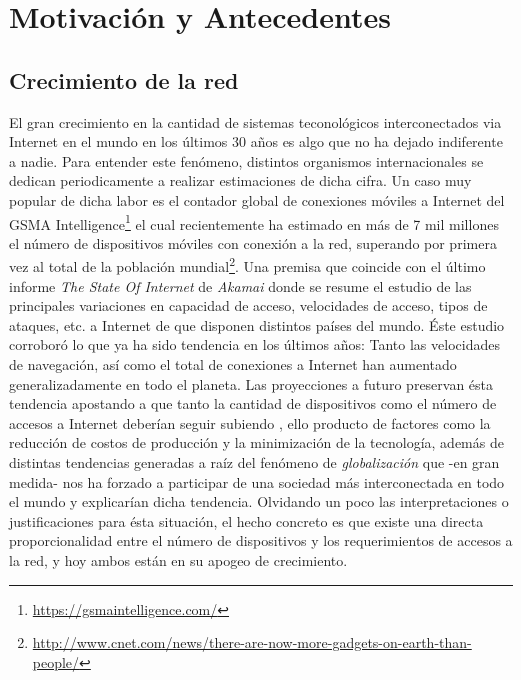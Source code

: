 \chapter{Motivación y Antecedentes}
\section{Crecimiento de la red}
El gran crecimiento en la cantidad de sistemas teconológicos interconectados via Internet en el mundo en los últimos 30 años es algo que no ha dejado indiferente a nadie. Para entender este fenómeno, distintos organismos internacionales se dedican periodicamente a realizar estimaciones de dicha cifra. Un caso muy popular de dicha labor es el contador global de conexiones móviles a Internet del GSMA Intelligence\footnote{\url{https://gsmaintelligence.com/}} el cual recientemente ha estimado en más de 7 mil millones el número de dispositivos móviles con conexión a la red, superando por primera vez al total de la población mundial\footnote{\url{http://www.cnet.com/news/there-are-now-more-gadgets-on-earth-than-people/}}. Una premisa que coincide con el último informe \emph{The State Of Internet} de \emph{Akamai} \cite{report:akamai} donde se resume el estudio de las principales variaciones en capacidad de acceso, velocidades de acceso, tipos de ataques, etc. a Internet de que disponen distintos países del mundo. Éste estudio corroboró lo que ya ha sido tendencia en los últimos años: Tanto las velocidades de navegación, así como el total de conexiones a Internet han aumentado generalizadamente en todo el planeta. Las proyecciones a futuro preservan ésta tendencia apostando a que tanto la cantidad de dispositivos como el número de accesos a Internet deberían seguir subiendo \cite{nota:2020}, ello producto de factores como la reducción de costos de producción y la minimización de la tecnología, además de distintas tendencias generadas a raíz del fenómeno de \emph{globalización} que -en gran medida- nos ha forzado a participar de una sociedad más interconectada en todo el mundo y explicarían dicha tendencia. Olvidando un poco las interpretaciones o justificaciones para ésta situación, el hecho concreto es que existe una directa proporcionalidad entre el número de dispositivos y los requerimientos de accesos a la red, y hoy ambos están en su apogeo de crecimiento.


